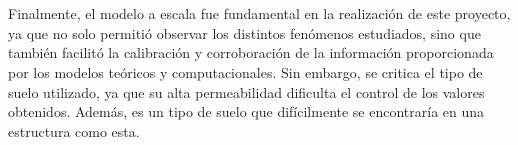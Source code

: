 \\ \\
Finalmente, el modelo a escala fue fundamental en la realización de este proyecto, ya que no solo permitió observar los distintos fenómenos estudiados, sino que también facilitó la calibración y corroboración de la información proporcionada por los modelos teóricos y computacionales. Sin embargo, se critica el tipo de suelo utilizado, ya que su alta permeabilidad dificulta el control de los valores obtenidos. Además, es un tipo de suelo que difícilmente se encontraría en una estructura como esta.
